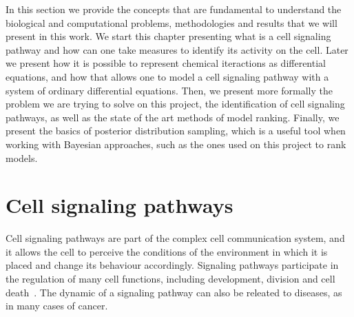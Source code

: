 
In this section we provide the concepts that are fundamental to 
understand the biological and computational problems, methodologies and
results that we will present in this work. We start this chapter 
presenting what is a cell signaling pathway and how can one take 
measures to identify its activity on the cell. Later we present how 
it is possible to represent chemical iteractions as differential 
equations, and how that allows one to model a cell signaling pathway
with a system of ordinary differential equations. Then, we present 
more formally the problem we are trying to solve on this project, the
identification of cell signaling pathways, as well as the state of the
art methods of model ranking. Finally, we present the basics of 
posterior distribution sampling, which is a useful tool when working 
with Bayesian approaches, such as the ones used on this project to rank 
models.

\section{Cell signaling pathways}
Cell signaling pathways are part of the complex cell communication 
system, and it allows the cell to perceive the conditions of the 
environment in which it is placed and change its behaviour accordingly.
Signaling pathways participate in the regulation of many cell functions,
including development, division and cell death~\cite{Hancock2017}. The
dynamic of a signaling pathway can also be releated to diseases, as in
many cases of cancer.

